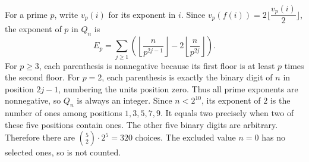 For a prime $p$, write $v_p(i)$ for its exponent in $i$. Since $v_p(f(i))=2\lfloor\dfrac{v_p(i)}{2}\rfloor$, the exponent of $p$ in $Q_n$ is\[E_p=\sum_{j\ge1}\left(\left\lfloor\dfrac{n}{p^{2j-1}}\right\rfloor-2\left\lfloor\dfrac{n}{p^{2j}}\right\rfloor\right).\]For $p\ge3$, each parenthesis is nonnegative because its first floor is at least $p$ times the second floor. For $p=2$, each parenthesis is exactly the binary digit of $n$ in position $2j-1$, numbering the units position zero. Thus all prime exponents are nonnegative, so $Q_n$ is always an integer. Since $n<2^{10}$, its exponent of $2$ is the number of ones among positions $1,3,5,7,9$. It equals two precisely when two of these five positions contain ones. The other five binary digits are arbitrary. Therefore there are $\binom52\cdot2^5=\boxed{320}$ choices. The excluded value $n=0$ has no selected ones, so is not counted.
